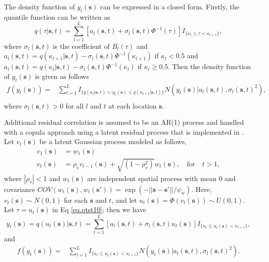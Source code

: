 \documentclass[fleqn,10pt]{wlscirep}
\newcommand{\bs}{\mathbf{s}}
\begin{document}
\bigskip
The density function of $y_t(\bs)$ can be expressed in a closed form. Firstly, the quantile function can be written as
\begin{equation}\label{eq.qtst10}
	q(\tau|\bs,t) = \sum_{l=1}^{L} \left[a_l(\bs,t) + \sigma_{l}(\bs,t)\Phi^{-1}(\tau) \right] I_{\{\kappa_{l}\leq \tau < \kappa_{l+1}\}},
\end{equation}
where $\sigma_{l}(\bs,t)$ is the coefficient of $B_l(\tau)$ and $a_l(\bs,t) = q(\kappa_{l+1}|\bs,t) - \sigma_{l}(\bs,t)\Phi^{-1}(\kappa_{l+1})$ if $\kappa_{l}<0.5$ and $a_l(\bs,t) = q(\kappa_{l}|\bs,t) - \sigma_{l}(\bs,t)\Phi^{-1}(\kappa_{l})$ if $\kappa_{l} \geq 0.5$. Then the density function of $y_t(\bs)$ is given as follows
\begin{equation} \label{eq.density}
	\begin{split}
		f(y_t(\bs)) =& \sum_{l=1}^{L} I_{\{q(\kappa_l|\bs,t)< y_t(\bs)\leq q(\kappa_{l+1}|\bs,t)\}} N(y_t(\bs) | a_l(\bs,t),\sigma_l(\bs,t)^2),\\
	\end{split}
\end{equation}
where $\sigma_l(\bs,t) >0$ for all $l$ and $t$ at each location $\bs$.

\bigskip
Additional residual correlation is assumed to be an AR(1) process and handled with a copula approach using a latent residual process that is implemented in \cite{Brian2013}. Let $v_t(\bs)$ be a latent Gaussian process modeled as follows,
\begin{equation}
	\begin{split}
		v_1(\bs) &= w_1(\bs) \\
		v_t(\bs) &= \rho_v v_{t-1}(\bs) + \sqrt{(1-\rho_v^2)}w_t(\bs), \quad\textrm{for}\quad t>1,
	\end{split}
\end{equation}
where $|\rho_v|<1$ and $w_t(\bs)$ are independent spatial process with mean 0 and covariance $COV(w_t(\bs), w_t(\bs')) = \exp(-||\bs-\bs' ||/\psi_w)$. Here, $v_t(\bs)\sim N(0,1)$ for each $\bs$ and $t$, and let $u_t(\bs) = \Phi(v_t(\bs))\sim U(0,1)$. Let $\tau = u_t(\bs)$ in Eq \eqref{eq.qtst10}; then we have
\begin{equation}\label{eq.qtst_yt}
	y_t(\bs) = q(u_t(\bs)|\bs,t) = \sum_{l=1}^{L} \left[a_l(\bs,t) + \sigma_{l}(\bs,t)u_t(\bs) \right] I_{\{\kappa_{l}\leq u_t(\bs) < \kappa_{l+1}\}},
\end{equation}
and
\begin{equation} \label{eq.density_yt}
	\begin{split}
		f(y_t(\bs)) =& \sum_{l=1}^{L} I_{\{\kappa_{l}\leq u_t(\bs) < \kappa_{l+1}\}} N(y_t(\bs) | a_l(\bs,t),\sigma_l(\bs,t)^2).\\
	\end{split}
\end{equation}
\end{document}
